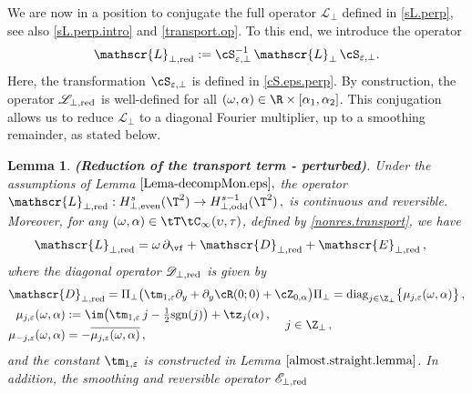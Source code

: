 \documentclass[a4paper,reqno,10pt]{article}
\newtheorem{lem}{Lemma}[section]
\newcommand{\pa}{\partial}
\newcommand{\sL}{\mathscr{L}}
\newcommand{\sE}{\mathscr{E}}
\newcommand{\sD}{\mathscr{D}}
\begin{document}
We are now in a position to conjugate the full operator $\sL_{\perp}$ defined in \eqref{sL.perp}, see also \eqref{sL.perp.intro} and \eqref{transport.op}. To this end, we introduce the  operator
\begin{align}\label{L-perp-red}
\sL_{\perp,{\rm red}} := \cS_{\varepsilon,\perp}^{-1} \, \sL_{\perp} \, \cS_{\varepsilon,\perp}.
\end{align}
Here, the transformation $\cS_{\varepsilon,\perp}$ is defined in \eqref{cS.eps.perp}. 
By construction, the operator $\sL_{\perp,{\rm red}}$ is well-defined for all $(\omega,\alpha)\in\R\times[\alpha_{1},\alpha_{2}]$. This conjugation allows us to reduce $\sL_{\perp}$ to a diagonal Fourier multiplier, up to a smoothing remainder, as stated below.
\begin{lem}\label{diffeo.conj.pert}
	{\bf (Reduction of the transport term - perturbed)}.
	Under the assumptions of Lemma $\ref{Lema-decompMon.eps},$ 
    the operator $\displaystyle{
			\sL_{\perp,{\rm red}}  : H_{\perp,{\rm even}}^{s}(\T^2) \to H_{\perp,{\rm odd}}^{s-1}(\T^2)}
			\,,
		$ is  continuous and reversible. Moreover, for any $(\omega,\alpha)\in \tT\tC_{\infty}(\upsilon,\tau)$, defined by  \eqref{nonres.transport}, we have 
    \begin{align*}
    \sL_{\perp,{\rm red}}&  = \omega\,\pa_{\vf} + \sD_{\perp,{\rm red}}  + \sE_{\perp,{\rm red}}		\,,
    \end{align*}
    where the diagonal operator $\sD_{\perp,{\rm red}}$ is given by
	\begin{equation}\label{diag.D.perp}
		\begin{aligned}
			&\sD_{\perp,{\rm red}}  = \Pi_{\perp}\big( \tm_{1,\varepsilon} \pa_{y} +\pa_{y}\cR(0;0)+ \cZ_{0,\alpha} \big)\Pi_{\perp}= {\rm diag}_{j\in\Z_{\perp}} \big\{  \mu_{j,\varepsilon}(\omega,\alpha) \big\}  \,,  \\
			&	\begin{aligned}
				\mu_{j,\varepsilon}(\omega,\alpha)& := \im \big(  \tm_{1,\varepsilon}\, j - \tfrac{1}{2} {\rm sgn}(j) \big) + \tz_{j}(\alpha) \,, \\
				\mu_{-j,\varepsilon}(\omega,\alpha)&= -\overline{\mu_{j,\varepsilon}(\omega,\alpha)} \,,
			\end{aligned} \quad \ j\in\Z_{\perp} \,,
		\end{aligned}
	\end{equation}
	and the constant $\tm_{1,\varepsilon}$ is constructed in Lemma $\ref{almost.straight.lemma}$.
	In addition,  the smoothing and reversible operator $\sE_{\perp,{\rm red}}$ 

\end{lem}
\end{document}

